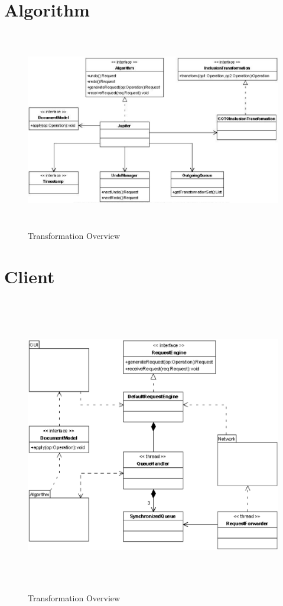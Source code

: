 \section{Algorithm}
\begin{figure}[H]
\centering
\includegraphics[height=8.74cm,width=14.95cm]{../../images/algo-impl/algorithm_diagram.eps}
\caption{Transformation Overview}
\label{Transformation Overview}
\end{figure}

\section{Client}
\begin{figure}[H]
\centering
\includegraphics[height=13.04cm,width=15.46cm]{../../images/algo-impl/client_diagram.eps}
\caption{Transformation Overview}
\label{Transformation Overview}
\end{figure}
